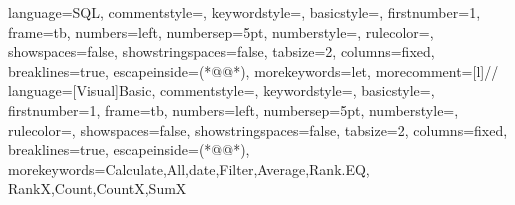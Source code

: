		{
			language=SQL,
			commentstyle=\color{vbagreen},  %
			keywordstyle=\color{vbablue},   %
			basicstyle=\footnotesize\ttfamily, %
			firstnumber=1,                	%
			frame=tb,	                	%
			numbers=left,                   %
			numbersep=5pt,                  %
			numberstyle=\tiny\color{gray},	%
			rulecolor=\color{black},        %
			showspaces=false,               %
			showstringspaces=false,         %
			tabsize=2,		                %
			columns=fixed,					%
			breaklines=true,				%
			escapeinside={(*@}{@*)},		%
			morekeywords={let},				%
			morecomment=[l]{//}				%
		}
		{
			language={[Visual]Basic},
			commentstyle=\color{vbagreen},  %
			keywordstyle=\color{vbablue},   %
			basicstyle=\footnotesize\ttfamily, %
			firstnumber=1,                	%
			frame=tb,	                	%
			numbers=left,                   %
			numbersep=5pt,                  %
			numberstyle=\tiny\color{gray},	%
			rulecolor=\color{black},        %
			showspaces=false,               %
			showstringspaces=false,         %
			tabsize=2,		                %
			columns=fixed,					%
			breaklines=true,				%
			escapeinside={(*@}{@*)},			%
			morekeywords={Calculate,All,date,Filter,Average,Rank.EQ, RankX,Count,CountX,SumX}
		}
	
